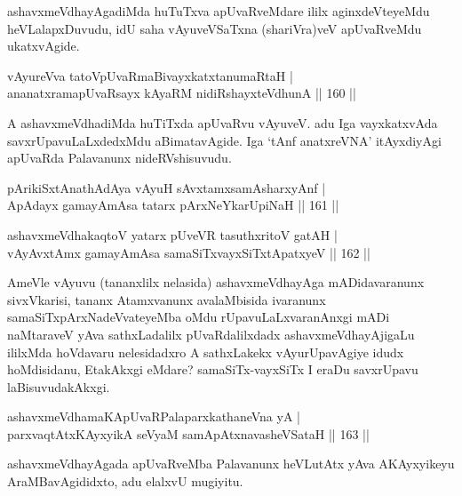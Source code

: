 \begin{artha}
ashavxmeVdhayAgadiMda huTuTxva apUvaRveMdare ililx aginxdeVteyeMdu heVLalapxDuvudu, idU saha vAyuveVSaTxna (shariVra)veV apUvaRveMdu ukatxvAgide.
\end{artha}


\begin{shl}
vAyureVva tatoV\s pUvaRmaBivayxkatxtanumaRtaH |\\
ananatxramapUvaRsayx kAyaRM nidiRshayxteV\s dhunA \hfill || 160 ||
\end{shl}

\begin{artha}
A ashavxmeVdhadiMda huTiTxda apUvaRvu vAyuveV. adu Iga vayxkatxvAda savxrUpavuLaLxdedxMdu aBimatavAgide. Iga `tAnf anatxreVNA' itAyxdiyAgi apUvaRda Palavanunx nideRVshisuvudu.
\end{artha}

\begin{shl}
pArikiSxtAnathA\s \s dAya vAyuH sAvxtamxsamAsharxyAnf |\\
ApAdayx gamayAmAsa tatarx pArxNeYkarUpiNaH \hfill || 161 ||
\end{shl}


\begin{shl}
ashavxmeVdhakaqtoV yatarx pUveVR tasuthxritoV gatAH |\\
vAyAvxtAmx gamayAmAsa samaSiTxvayxSiTxtApatxyeV \hfill || 162 ||
\end{shl}

\begin{artha}
AmeVle vAyuvu (tananxlilx nelasida) ashavxmeVdhayAga mADidavaranunx sivxVkarisi, tananx Atamxvanunx avalaMbisida ivaranunx samaSiTxpArxNadeVvateyeMba oMdu rUpavuLaLxvaranAnxgi mADi naMtaraveV yAva sathxLadalilx pUvaRdalilxdadx ashavxmeVdhayAjigaLu ililxMda hoVdavaru nelesidadxro A sathxLakekx vAyurUpavAgiye idudx hoMdisidanu, EtakAkxgi eMdare? samaSiTx-vayxSiTx I eraDu savxrUpavu laBisuvudakAkxgi.
\end{artha}

\begin{shl}
ashavxmeVdhamaKApUvaRPalaparxkathaneVna yA |\\
parxvaqtAtx\s \s KAyxyikA seVyaM samApAtx\s navasheVSataH \hfill || 163 ||
\end{shl}

\begin{artha}
ashavxmeVdhayAgada apUvaRveMba Palavanunx heVLutAtx yAva AKAyxyikeyu AraMBavAgididxto, adu elalxvU mugiyitu.
\end{artha}

